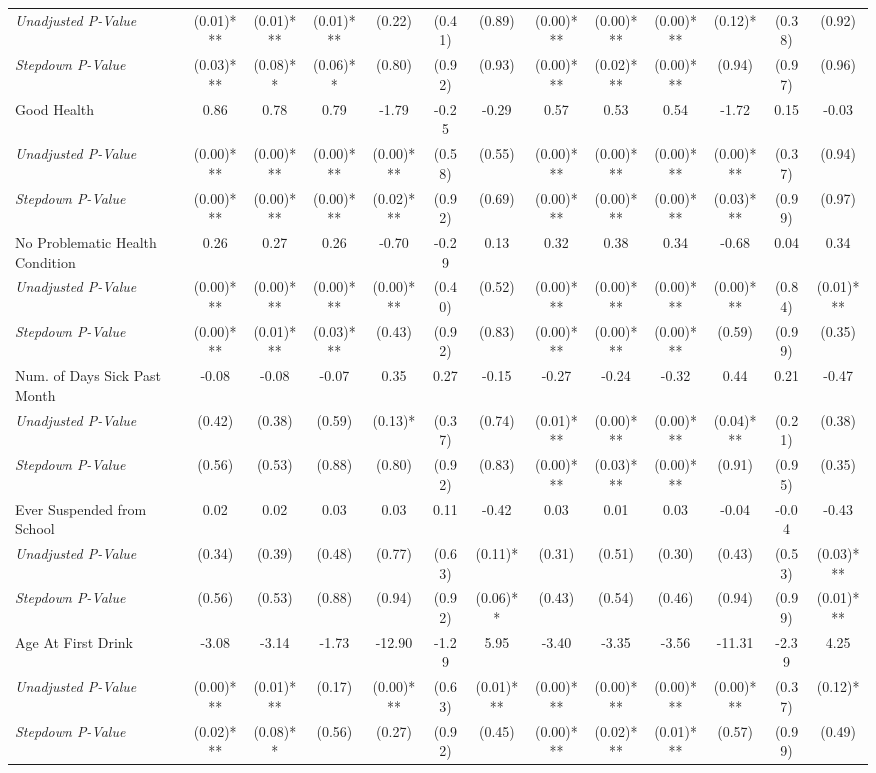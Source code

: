 \begin{tabular}{l c c c c c c c c c c c c}
\quad \textit{Unadjusted P-Value} & (0.01)*** & (0.01)*** & (0.01)*** & (0.22) & (0.41) & (0.89) & (0.00)*** & (0.00)*** & (0.00)*** & (0.12)* & (0.38) & (0.92) \\
\quad \textit{Stepdown P-Value} & (0.03)*** & (0.08)** & (0.06)** & (0.80) & (0.92) & (0.93) & (0.00)*** & (0.02)*** & (0.00)*** & (0.94) & (0.97) & (0.96) \\
Good Health & 0.86 & 0.78 & 0.79 & -1.79 & -0.25 & -0.29 & 0.57 & 0.53 & 0.54 & -1.72 & 0.15 & -0.03 \\
\quad \textit{Unadjusted P-Value} & (0.00)*** & (0.00)*** & (0.00)*** & (0.00)*** & (0.58) & (0.55) & (0.00)*** & (0.00)*** & (0.00)*** & (0.00)*** & (0.37) & (0.94) \\
\quad \textit{Stepdown P-Value} & (0.00)*** & (0.00)*** & (0.00)*** & (0.02)*** & (0.92) & (0.69) & (0.00)*** & (0.00)*** & (0.00)*** & (0.03)*** & (0.99) & (0.97) \\
No Problematic Health Condition & 0.26 & 0.27 & 0.26 & -0.70 & -0.29 & 0.13 & 0.32 & 0.38 & 0.34 & -0.68 & 0.04 & 0.34 \\
\quad \textit{Unadjusted P-Value} & (0.00)*** & (0.00)*** & (0.00)*** & (0.00)*** & (0.40) & (0.52) & (0.00)*** & (0.00)*** & (0.00)*** & (0.00)*** & (0.84) & (0.01)*** \\
\quad \textit{Stepdown P-Value} & (0.00)*** & (0.01)*** & (0.03)*** & (0.43) & (0.92) & (0.83) & (0.00)*** & (0.00)*** & (0.00)*** & (0.59) & (0.99) & (0.35) \\
Num. of Days Sick Past Month & -0.08 & -0.08 & -0.07 & 0.35 & 0.27 & -0.15 & -0.27 & -0.24 & -0.32 & 0.44 & 0.21 & -0.47 \\
\quad \textit{Unadjusted P-Value} & (0.42) & (0.38) & (0.59) & (0.13)* & (0.37) & (0.74) & (0.01)*** & (0.00)*** & (0.00)*** & (0.04)*** & (0.21) & (0.38) \\
\quad \textit{Stepdown P-Value} & (0.56) & (0.53) & (0.88) & (0.80) & (0.92) & (0.83) & (0.00)*** & (0.03)*** & (0.00)*** & (0.91) & (0.95) & (0.35) \\
Ever Suspended from School & 0.02 & 0.02 & 0.03 & 0.03 & 0.11 & -0.42 & 0.03 & 0.01 & 0.03 & -0.04 & -0.04 & -0.43 \\
\quad \textit{Unadjusted P-Value} & (0.34) & (0.39) & (0.48) & (0.77) & (0.63) & (0.11)* & (0.31) & (0.51) & (0.30) & (0.43) & (0.53) & (0.03)*** \\
\quad \textit{Stepdown P-Value} & (0.56) & (0.53) & (0.88) & (0.94) & (0.92) & (0.06)** & (0.43) & (0.54) & (0.46) & (0.94) & (0.99) & (0.01)*** \\
Age At First Drink & -3.08 & -3.14 & -1.73 & -12.90 & -1.29 & 5.95 & -3.40 & -3.35 & -3.56 & -11.31 & -2.39 & 4.25 \\
\quad \textit{Unadjusted P-Value} & (0.00)*** & (0.01)*** & (0.17) & (0.00)*** & (0.63) & (0.01)*** & (0.00)*** & (0.00)*** & (0.00)*** & (0.00)*** & (0.37) & (0.12)* \\
\quad \textit{Stepdown P-Value} & (0.02)*** & (0.08)** & (0.56) & (0.27) & (0.92) & (0.45) & (0.00)*** & (0.02)*** & (0.01)*** & (0.57) & (0.99) & (0.49) \\
\bottomrule
\end{tabular}
